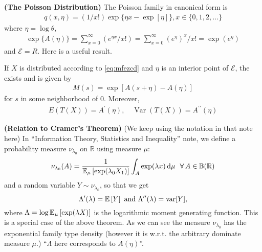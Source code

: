 \documentclass{article}
\newcommand{\bfs}[1]{\textbf{({#1}) }}
\begin{document}
\begin{exma}\bfs{The Poisson Distribution}\label{possion_1} The Poisson family in canonical form is
\begin{align*}
q(x, \eta)=(1 / x !) \exp \big\{\eta x-\exp [\eta]\big\}, x \in\{0,1,2, \ldots\}
\end{align*}
where $\eta=\log \theta$,
\begin{align*}
\exp \{A(\eta)\}=\sum_{x=0}^{\infty}\left(e^{\eta x} / x !\right)=\sum_{x=0}^{\infty}\left(e^{\eta}\right)^{x} / x !=\exp \left(e^{\eta}\right)
\end{align*}
and $\mathcal{E}=R$.
Here is a useful result.
\end{exma}
\begin{thma}\label{thm:mom_gen_one_para}
If $X$ is distributed according to \cref{eq:mfezcd} and $\eta$ is an interior point of $\mathcal{E}$, the  exists and is given by
\begin{align*}
M(s)=\exp [A(s+\eta)-A(\eta)]
\end{align*}
for $s$ in some neighborhood of $0$.
Moreover,
\begin{align*}
E(T(X))=A^{\prime}(\eta), \quad \operatorname{Var}(T(X))=A^{\prime \prime}(\eta)
\end{align*}
\end{thma} 
\begin{rema}\bfs{Relation to Cramer's Theorem}\label{re:fgere} (We keep using the notation in that note here)
In 	``Information Theory, Statistics and Inequality'' note, we define a probability measure $\nu_{\lambda_0}$ on $\mathbb{R}$ using measure $\mu$:
			\begin{align*}
			\nu_{\lambda_0}(A)=\frac{1}{\E_\mu[\exp(\lambda_0 X_1)]}\int_{A}\exp(\lambda x)\ud \mu\ \ \forall A \in\mathbb{B}(\mathbb{R})
			\end{align*}
		and a random variable $Y\sim \nu_{\lambda_0}$, so that we get
		$$	\Lambda'(\lambda) =\E [Y] \text{ and } \Lambda''(\lambda)=\mathrm{var}[Y],$$
		where $\Lambda = \log \E_\mu [\exp(\lambda X)]$ is the logarithmic moment generating function.
	This is a special case of the above theorem.  As we can see the  measure $\nu_{\lambda_0}$ has the exponential family type density (however it is w.r.t. the arbitrary dominate measure $\mu$.) ``$\Lambda$ here corresponds to $A(\eta)$''. 
	
\end{rema}
\end{document}
